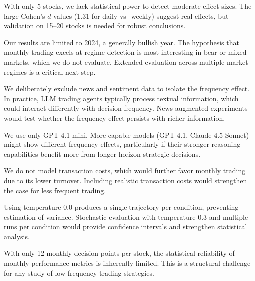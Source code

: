 With only 5 stocks, we lack statistical power to detect moderate effect sizes. The large Cohen's $d$ values (1.31 for daily vs.\ weekly) suggest real effects, but validation on 15--20 stocks is needed for robust conclusions.

Our results are limited to 2024, a generally bullish year. The hypothesis that monthly trading excels at regime detection is most interesting in bear or mixed markets, which we do not evaluate. Extended evaluation across multiple market regimes is a critical next step.

We deliberately exclude news and sentiment data to isolate the frequency effect. In practice, LLM trading agents typically process textual information, which could interact differently with decision frequency. News-augmented experiments would test whether the frequency effect persists with richer information.

We use only GPT-4.1-mini. More capable models (\eg GPT-4.1, Claude 4.5 Sonnet) might show different frequency effects, particularly if their stronger reasoning capabilities benefit more from longer-horizon strategic decisions.

We do not model transaction costs, which would further favor monthly trading due to its lower turnover. Including realistic transaction costs would strengthen the case for less frequent trading.

Using temperature 0.0 produces a single trajectory per condition, preventing estimation of variance. Stochastic evaluation with temperature 0.3 and multiple runs per condition would provide confidence intervals and strengthen statistical analysis.

With only 12 monthly decision points per stock, the statistical reliability of monthly performance metrics is inherently limited. This is a structural challenge for any study of low-frequency trading strategies.
